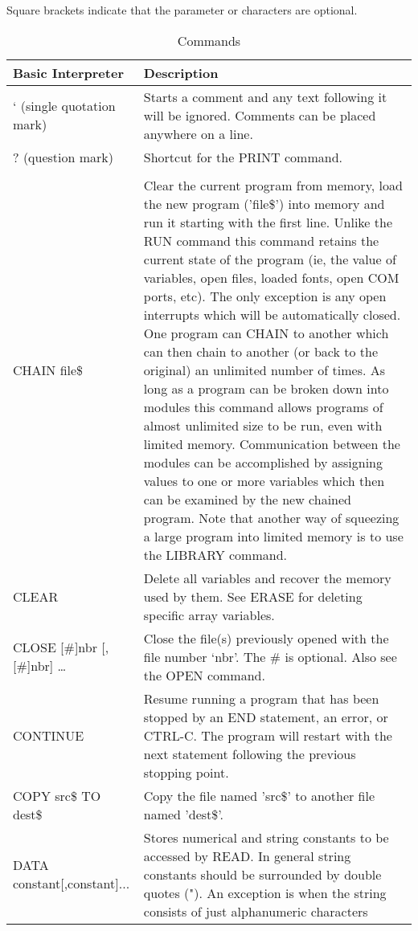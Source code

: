 \documentclass[11pt,fleqn]{book} %
\numberwithin{equation}{section} %
\numberwithin{figure}{section} %
\numberwithin{table}{section} %
\begin{document}
Square brackets indicate that the parameter or characters are optional.
\begin{table}[]
\centering
\caption{Commands}
\label{Commands}
\begin{tabular}{|p{4cm}|p{10cm}|}
\hline
\textbf{Basic Interpreter} & \textbf{Description}                                                             \\ \hline
‘ (single quotation mark) & Starts a comment and any text following it will be ignored. Comments
can be placed anywhere on a line.
\\ \hline
? (question mark) & Shortcut for the PRINT command.
\\ \hline
\\ \hline
CHAIN file\$ &
Clear the current program from memory, load the new program ('file\$')
into memory and run it starting with the first line.
Unlike the RUN command this command retains the current state of the
program (ie, the value of variables, open files, loaded fonts, open COM
ports, etc). The only exception is any open interrupts which will be
automatically closed.
One program can CHAIN to another which can then chain to another (or
back to the original) an unlimited number of times. As long as a
program can be broken down into modules this command allows
programs of almost unlimited size to be run, even with limited memory.
Communication between the modules can be accomplished by assigning
values to one or more variables which then can be examined by the new
chained program.
Note that another way of squeezing a large program into limited memory
is to use the LIBRARY command.
\\ \hline
CLEAR & Delete all variables and recover the memory used by them.
See ERASE for deleting specific array variables.
\\ \hline
CLOSE [\#]nbr [,[\#]nbr] … &
Close the file(s) previously opened with the file number ‘nbr’.
The \# is optional. Also see the OPEN command.
\\ \hline
CONTINUE & Resume running a program that has been stopped by an END statement,
an error, or CTRL-C. The program will restart with the next statement
following the previous stopping point.
\\ \hline
COPY src\$ TO dest\$ & Copy the file named 'src\$' to another file named 'dest\$'.
\\ \hline
DATA constant[,constant]... & Stores numerical and string constants to be accessed by READ.
In general string constants should be surrounded by double quotes (").
An exception is when the string consists of just alphanumeric characters

\end{tabular}
\end{table}
\end{document}
